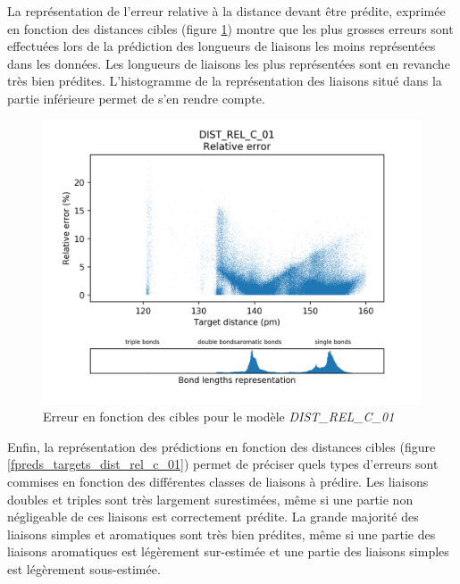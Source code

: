 \par La représentation de l'erreur relative à la distance devant être prédite, exprimée en fonction des distances cibles (figure \ref{fdistrib_err_rel_dist_rel_c_01}) montre que les plus grosses erreurs sont effectuées lors de la prédiction des longueurs de liaisons les moins représentées dans les données. Les longueurs de liaisons les plus représentées sont en revanche très bien prédites. L'histogramme de la représentation des liaisons situé dans la partie inférieure permet de s'en rendre compte.

\begin{figure}
	\centering
	
	\includegraphics[scale=0.7]{../figures/DIST_REL_C_01/DIST_REL_C_01_distrib_rmse_dist.png}	
	
	\caption{Erreur en fonction des cibles pour le modèle \emph{DIST\_REL\_C\_01}}
	\label{fdistrib_err_rel_dist_rel_c_01}
\end{figure}

\par Enfin, la représentation des prédictions en fonction des distances cibles (figure \ref{fpreds_targets_dist_rel_c_01}) permet de préciser quels types d'erreurs sont commises en fonction des différentes classes de liaisons à prédire. Les liaisons doubles et triples sont très largement surestimées, même si une partie non négligeable de ces liaisons est correctement prédite. La grande majorité des liaisons simples et aromatiques sont très bien prédites, même si une partie des liaisons aromatiques est légèrement sur-estimée et une partie des liaisons simples est légèrement sous-estimée.\\

